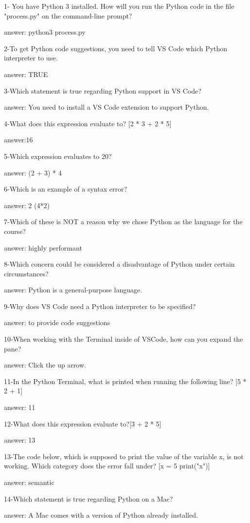 
1- You have Python 3 installed. How will you run the Python code in the file "process.py" on the command-line prompt?

answer: python3 process.py

2-To get Python code suggestions, you need to tell VS Code which Python interpreter to use.

answer: TRUE

3-Which statement is true regarding Python support in VS Code?

answer: You need to install a VS Code extension to support Python.

4-What does this expression evaluate to? [2 * 3 + 2 * 5]

answer:16 

5-Which expression evaluates to 20?

answer: (2 + 3) * 4

6-Which is an example of a syntax error?

answer: 2 (4*2)

7-Which of these is NOT a reason why we chose Python as the language for the course?

answer: highly performant

8-Which concern could be considered a disadvantage of Python under certain circumstances?

answer: Python is a general-purpose language.

9-Why does VS Code need a Python interpreter to be specified?

answer: to provide code suggestions

10-When working with the Terminal inside of VSCode, how can you expand the pane?

answer: Click the up arrow.

11-In the Python Terminal, what is printed when running the following line? [5 * 2 + 1]

answer: 11

12-What does this expression evaluate to?[3 + 2 * 5]

answer: 13

13-The code below, which is supposed to print the value of the variable x, is not working. Which category does the error fall under?
[x = 5
 print("x")]

answer: semantic

14-Which statement is true regarding Python on a Mac?

answer: A Mac comes with a version of Python already installed.

